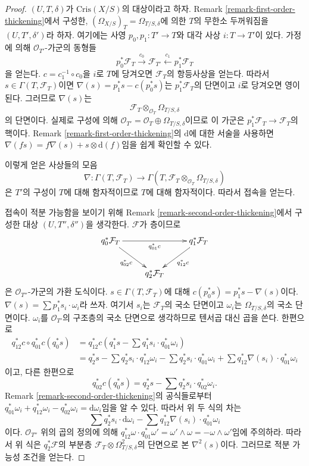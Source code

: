 \begin{proof}
$(U, T, \delta)$가 $\text{Cris}(X/S)$의 대상이라고 하자.
Remark \ref{remark-first-order-thickening}에서 구성한,
$(\Omega_{X/S})_T = \Omega_{T/S, \delta}$에 의한 $T$의
무한소 두꺼워짐을 $(U, T', \delta')$라 하자. 여기에는 사영
$p_0, p_1 : T' \to T$와 대각 사상 $i : T \to T'$이 있다.
가정에 의해 $\mathcal{O}_{T'}$-가군의 동형들
$$
p_0^*\mathcal{F}_T \xrightarrow{c_0}
\mathcal{F}_{T'} \xleftarrow{c_1}
p_1^*\mathcal{F}_T
$$
을 얻는다. $c = c_1^{-1} \circ c_0$을 $i$로 $T$에 당겨오면
$\mathcal{F}_T$의 항등사상을 얻는다. 따라서
$s \in \Gamma(T, \mathcal{F}_T)$이면
$\nabla(s) = p_1^*s - c(p_0^*s)$는 $p_1^*\mathcal{F}_T$의
단면이고 $i$로 당겨오면 영이 된다. 그러므로 $\nabla(s)$는
$$
\mathcal{F}_T
\otimes_{\mathcal{O}_T}
\Omega_{T/S, \delta}
$$
의 단면이다. 실제로 구성에 의해
$\mathcal{O}_{T'} = \mathcal{O}_T \oplus \Omega_{T/S, \delta}$이므로
이 가군은 $p_1^*\mathcal{F}_T \to \mathcal{F}_T$의 핵이다.
Remark \ref{remark-first-order-thickening}의 $\text{d}$에 대한
서술을 사용하면 $\nabla(fs) =
f\nabla(s) + s \otimes \text{d}(f)$임을 쉽게 확인할 수 있다.

\medskip\noindent
이렇게 얻은 사상들의 모음
$$
\nabla : \Gamma(T, \mathcal{F}_T) \to
\Gamma(T, \mathcal{F}_T \otimes_{\mathcal{O}_T} \Omega_{T/S, \delta})
$$
은 $T'$의 구성이 $T$에 대해 함자적이므로 $T$에 대해 함자적이다.
따라서 접속을 얻는다.

\medskip\noindent
접속이 적분 가능함을 보이기 위해 Remark
\ref{remark-second-order-thickening}에서 구성한 대상
$(U, T'', \delta'')$을 생각한다. $\mathcal{F}$가 층이므로
$$
\xymatrix{
q_0^*\mathcal{F}_T \ar[rr]_{q_{01}^*c} \ar[rd]_{q_{02}^*c} & &
q_1^*\mathcal{F}_T \ar[ld]^{q_{12}^*c} \\
& q_2^*\mathcal{F}_T
}
$$
은 $\mathcal{O}_{T''}$-가군의 가환 도식이다.
$s \in \Gamma(T, \mathcal{F}_T)$에 대해
$c(p_0^*s) = p_1^*s - \nabla(s)$이다.
$\nabla(s) = \sum p_1^*s_i \cdot \omega_i$라 쓰자. 여기서 $s_i$는
$\mathcal{F}_T$의 국소 단면이고 $\omega_i$는
$\Omega_{T/S, \delta}$의 국소 단면이다. $\omega_i$를
$\mathcal{O}_{T'}$의 구조층의 국소 단면으로 생각하므로 텐서곱
대신 곱을 쓴다. 한편으로
\begin{align*}
q_{12}^*c \circ q_{01}^*c(q_0^*s) & =
q_{12}^*c(q_1^*s - \sum q_1^*s_i \cdot q_{01}^*\omega_i) \\
& =
q_2^*s - \sum q_2^*s_i \cdot q_{12}^*\omega_i -
\sum q_2^*s_i \cdot q_{01}^*\omega_i +
\sum q_{12}^*\nabla(s_i) \cdot q_{01}^*\omega_i
\end{align*}
이고, 다른 한편으로
$$
q_{02}^*c(q_0^*s) = q_2^*s - \sum q_2^*s_i \cdot q_{02}^*\omega_i.
$$
Remark \ref{remark-second-order-thickening}의 공식들로부터
$q_{01}^*\omega_i + q_{12}^*\omega_i - q_{02}^*\omega_i = \text{d}\omega_i$임을
알 수 있다. 따라서 위 두 식의 차는
$$
\sum q_2^*s_i \cdot \text{d}\omega_i -
\sum q_{12}^*\nabla(s_i) \cdot q_{01}^*\omega_i
$$
이다. $\mathcal{O}_{T''}$ 위의 곱의 정의에 의해
$q_{12}^*\omega \cdot q_{01}^*\omega' = \omega' \wedge \omega =
- \omega \wedge \omega'$임에 주의하라. 따라서 위 식은
$q_2^*\mathcal{F}$의 부분층
$\mathcal{F}_T \otimes \Omega^2_{T/S, \delta}$의 단면으로 본
$\nabla^2(s)$이다. 그러므로 적분 가능성 조건을 얻는다.
\end{proof}





